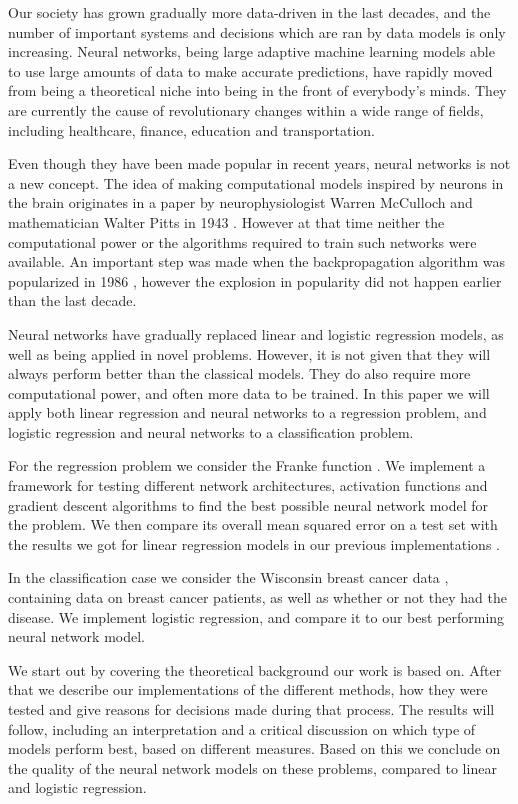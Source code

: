 


Our society has grown gradually more data-driven in the last decades, and the number of important systems and decisions which are ran by data models is only increasing.
Neural networks, being large adaptive machine learning models able to use large amounts of data to make accurate predictions, have rapidly moved from being a theoretical niche into being in the front of everybody's minds.
They are currently the cause of revolutionary changes within a wide range of fields, including healthcare, finance, education and transportation.

Even though they have been made popular in recent years, neural networks is not a new concept.
The idea of making computational models inspired by neurons in the brain originates in a paper by neurophysiologist Warren McCulloch and mathematician Walter Pitts in 1943 \citep[p. 4]{NN_history}.
However at that time neither the computational power or the algorithms required to train such networks were available.
An important step was made when the backpropagation algorithm was popularized in 1986 \citep[p. 5]{NN_history}, however the explosion in popularity did not happen earlier than the last decade.

Neural networks have gradually replaced linear and logistic regression models, as well as being applied in novel problems.
However, it is not given that they will always perform better than the classical models.
They do also require more computational power, and often more data to be trained.
In this paper we will apply both linear regression and neural networks to a regression problem, and logistic regression and neural networks to a classification problem.

For the regression problem we consider the Franke function \cite{frank}.
We implement a framework for testing different network architectures, activation functions and gradient descent algorithms to find the best possible neural network model for the problem.
We then compare its overall mean squared error on a test set with the results we got for linear regression models in our previous implementations \cite{project1}.

In the classification case we consider the Wisconsin breast cancer data \cite{breast_cancer_wisconsin}, containing data on breast cancer patients, as well as whether or not they had the disease.
We implement logistic regression, and compare it to our best performing neural network model.

We start out by covering the theoretical background our work is based on.
After that we describe our implementations of the different methods, how they were tested and give reasons for decisions made during that process.
The results will follow, including an interpretation and a critical discussion on which type of models perform best, based on different measures.
Based on this we conclude on the quality of the neural network models on these problems, compared to linear and logistic regression.